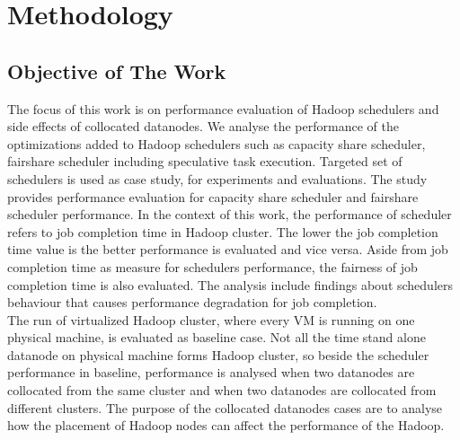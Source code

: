 
\chapter{Methodology } %

\label{Chapter4} %



\section{Objective of The Work}

The focus of this work is on performance evaluation of Hadoop schedulers and side effects of collocated datanodes. We analyse the performance of the optimizations added to Hadoop schedulers such as capacity share scheduler, fairshare scheduler including speculative task execution. Targeted set of schedulers is used as case study, for experiments and evaluations. The study provides performance evaluation for capacity share scheduler and fairshare scheduler performance. In the context of this work, the performance of scheduler refers to job completion time in Hadoop cluster. The lower the job completion time value is the better performance is evaluated and vice versa. Aside from job completion time as measure for schedulers performance, the fairness of job completion time is also evaluated. The analysis include findings about schedulers behaviour that causes performance degradation for job completion.\\
 
 The run of virtualized Hadoop cluster, where every VM‌ is running on one physical machine, is evaluated as baseline case. Not all the time stand alone datanode on physical machine forms Hadoop cluster, so beside the scheduler performance in baseline, performance is analysed when two datanodes are collocated from the same cluster and when two datanodes are collocated from different clusters. The purpose of the collocated datanodes cases are to analyse how the placement of Hadoop nodes can affect the performance of the Hadoop. 


